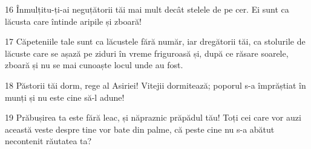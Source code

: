 \par 16 Înmulțitu-ți-ai neguțătorii tăi mai mult decât stelele de pe cer. Ei sunt ca lăcusta care întinde aripile și zboară!
\par 17 Căpeteniile tale sunt ca lăcustele fără număr, iar dregătorii tăi, ca stolurile de lăcuste care se așază pe ziduri în vreme friguroasă și, după ce răsare soarele, zboară și nu se mai cunoaște locul unde au fost.
\par 18 Păstorii tăi dorm, rege al Asiriei! Vitejii dormitează; poporul s-a împrăștiat în munți și nu este cine să-l adune!
\par 19 Prăbușirea ta este fără leac, și năpraznic prăpădul tău! Toți cei care vor auzi această veste despre tine vor bate din palme, că peste cine nu s-a abătut necontenit răutatea ta?


